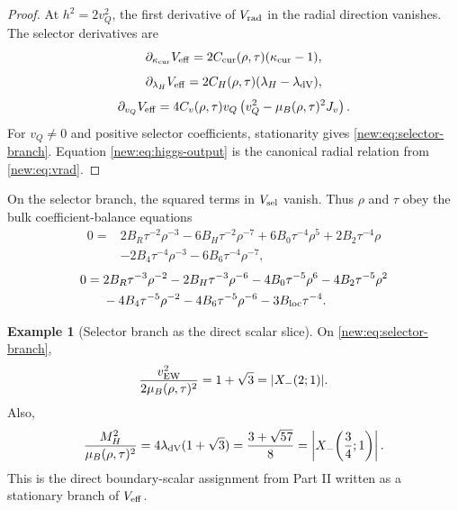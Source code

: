 \documentclass[11pt]{article}
\theoremstyle{plain}
\theoremstyle{definition}
\newtheorem{example}[proposition]{Example}
\begin{document}
\begin{proof}
At \(h^2=2v_Q^2\), the first derivative of \(V_{\rm rad}\) in the radial
direction vanishes.  The selector derivatives are
\[
  \partial_{\kappa_{\rm cur}}V_{\rm eff}
  =2C_{\rm cur}(\rho,\tau)(\kappa_{\rm cur}-1),
\]
\[
  \partial_{\lambda_H}V_{\rm eff}
  =2C_H(\rho,\tau)(\lambda_H-\lambda_{\rm dV}),
\]
\[
  \partial_{v_Q}V_{\rm eff}
  =4C_v(\rho,\tau)v_Q
  \left(v_Q^2-\mu_B(\rho,\tau)^2J_v\right).
\]
For \(v_Q\ne0\) and positive selector coefficients, stationarity gives
\eqref{new:eq:selector-branch}.  Equation \eqref{new:eq:higgs-output} is the
canonical radial relation from \eqref{new:eq:vrad}.
\end{proof}

On the selector branch, the squared terms in \(V_{\rm sel}\) vanish.  Thus
\(\rho\) and \(\tau\) obey the bulk coefficient-balance equations
\begin{equation}
\begin{split}
  0={}&
  2B_R\tau^{-2}\rho^{-3}
  -6B_H\tau^{-2}\rho^{-7}
  +6B_0\tau^{-4}\rho^5
  +2B_2\tau^{-4}\rho\\
  &-2B_4\tau^{-4}\rho^{-3}
  -6B_6\tau^{-4}\rho^{-7},
  \label{new:eq:rho-balance}
\end{split}
\end{equation}
\begin{equation}
\begin{split}
  0={}&
  2B_R\tau^{-3}\rho^{-2}
  -2B_H\tau^{-3}\rho^{-6}
  -4B_0\tau^{-5}\rho^6
  -4B_2\tau^{-5}\rho^2\\
  &-4B_4\tau^{-5}\rho^{-2}
  -4B_6\tau^{-5}\rho^{-6}
  -3B_{\rm loc}\tau^{-4}.
  \label{new:eq:tau-balance}
\end{split}
\end{equation}

\begin{example}[Selector branch as the direct scalar slice]
\label{new:ex:selector-slice}
On \eqref{new:eq:selector-branch},
\[
  \frac{v_{\rm EW}^2}{2\mu_B(\rho,\tau)^2}=1+\sqrt3=|X_-(2;1)|.
\]
Also,
\[
  \frac{M_H^2}{\mu_B(\rho,\tau)^2}
  =4\lambda_{\rm dV}(1+\sqrt3)
  =\frac{3+\sqrt{57}}{8}
  =\left|X_-\!\left(\frac34;1\right)\right|.
\]
This is the direct boundary-scalar assignment from Part II written as a
stationary branch of \(V_{\rm eff}\).
\end{example}
\end{document}
